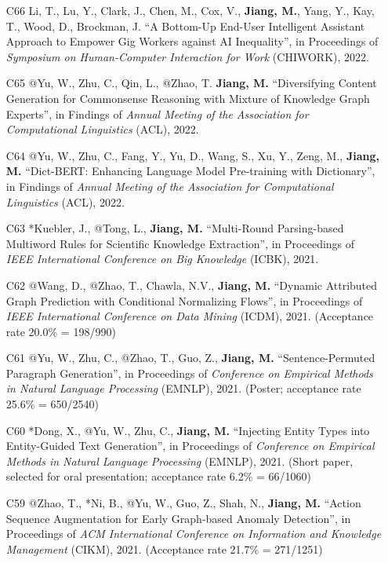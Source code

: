 \documentclass[10pt]{article}
\newenvironment{myindentpar}[1]%
{\begin{list}{}%
         {\setlength{\leftmargin}{#1}}%
         \item[]%
}
{\end{list}}
\newcounter{list}
\begin{document}
\begin{myindentpar}{0.00cm}
\begin{enumerate}[leftmargin=.5cm]
\item[C66] Li, T., Lu, Y., Clark, J., Chen, M., Cox, V., \textbf{Jiang, M.}, Yang, Y., Kay, T., Wood, D., Brockman, J. ``A Bottom-Up End-User Intelligent Assistant Approach to Empower Gig Workers against AI Inequality'', in Proceedings of \textit{Symposium on Human-Computer Interaction for Work} (CHIWORK), 2022.
		
\item[C65] @Yu, W., Zhu, C., Qin, L., @Zhao, T. \textbf{Jiang, M.} ``Diversifying Content Generation for Commonsense Reasoning with Mixture of Knowledge Graph Experts'', in Findings of \textit{Annual Meeting of the Association for Computational Linguistics} (ACL), 2022.

\item[C64] @Yu, W., Zhu, C., Fang, Y., Yu, D., Wang, S., Xu, Y., Zeng, M., \textbf{Jiang, M.} ``Dict-BERT: Enhancing Language Model Pre-training with Dictionary'', in Findings of \textit{Annual Meeting of the Association for Computational Linguistics} (ACL), 2022.

\item[C63] *Kuebler, J., @Tong, L., \textbf{Jiang, M.} ``Multi-Round Parsing-based Multiword Rules for Scientific Knowledge Extraction'', in Proceedings of \textit{IEEE International Conference on Big Knowledge} (ICBK), 2021.
		
\item[C62] @Wang, D., @Zhao, T., Chawla, N.V., \textbf{Jiang, M.} ``Dynamic Attributed Graph Prediction with Conditional Normalizing Flows'', in Proceedings of \textit{IEEE International Conference on Data Mining} (ICDM), 2021. (Acceptance rate 20.0\% = 198/990)

\item[C61] @Yu, W., Zhu, C., @Zhao, T., Guo, Z., \textbf{Jiang, M.} ``Sentence-Permuted Paragraph Generation'', in Proceedings of \textit{Conference on Empirical Methods in Natural Language Processing} (EMNLP), 2021. (Poster; acceptance rate 25.6\% = 650/2540)

\item[C60] *Dong, X., @Yu, W., Zhu, C., \textbf{Jiang, M.} ``Injecting Entity Types into Entity-Guided Text Generation'', in Proceedings of \textit{Conference on Empirical Methods in Natural Language Processing} (EMNLP), 2021. (Short paper, selected for oral presentation; acceptance rate 6.2\% = 66/1060)

\item[C59] @Zhao, T., *Ni, B., @Yu, W., Guo, Z., Shah, N., \textbf{Jiang, M.} ``Action Sequence Augmentation for Early Graph-based Anomaly Detection'', in Proceedings of \textit{ACM International Conference on Information and Knowledge Management} (CIKM), 2021. (Acceptance rate 21.7\% = 271/1251)
		

\end{enumerate}
\end{myindentpar}
\end{document}
